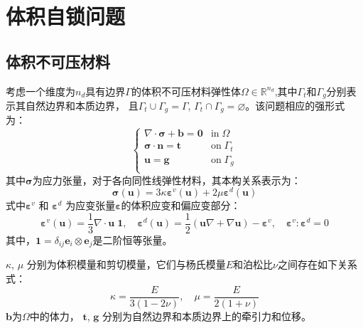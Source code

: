 \chapter{体积自锁问题}
\section{体积不可压材料}               
考虑一个维度为$n_d$具有边界$\Gamma$的体积不可压材料弹性体$\Omega\in \mathbb R^{n_d}$,其中$\Gamma_t$和$\Gamma_g$分别表示其自然边界和本质边界，
且$\Gamma_t \cup \Gamma_g = \Gamma$, $\Gamma_t \cap \Gamma_g = \varnothing$。该问题相应的强形式为：
\begin{equation}\label{strong_penalty}
    \begin{cases}
        \nabla \cdot \boldsymbol \sigma + \boldsymbol b = \boldsymbol 0 & \mathrm{in} \; \Omega \\
        \boldsymbol \sigma \cdot \boldsymbol n = \boldsymbol t & \mathrm{on} \; \Gamma_t \\
        \boldsymbol u = \boldsymbol g & \mathrm{on} \; \Gamma_g \\
\end{cases}
\end{equation}
其中$\boldsymbol \sigma$为应力张量，对于各向同性线弹性材料，其本构关系表示为：
\begin{equation}\label{stress_penalty}
    \boldsymbol \sigma(\boldsymbol u) = 3\kappa \boldsymbol \varepsilon^v(\boldsymbol u) + 2\mu \boldsymbol \varepsilon^d(\boldsymbol u) 
\end{equation}
式中$\boldsymbol \varepsilon^v$ 和 $\boldsymbol \varepsilon^d$ 为应变张量$\boldsymbol \varepsilon$的体积应变和偏应变部分：
\begin{equation}
    \boldsymbol \varepsilon^v(\boldsymbol u) =\frac{1}{3} \nabla \cdot \boldsymbol u \; \boldsymbol 1, \quad
    \boldsymbol \varepsilon^d(\boldsymbol u) =\frac{1}{2}(\boldsymbol u \nabla + \nabla \boldsymbol u) - \boldsymbol \varepsilon^v, \quad
    \boldsymbol \varepsilon^v : \boldsymbol \varepsilon^d = 0
\end{equation}
其中，$\boldsymbol 1 = \delta_{ij} \boldsymbol e_i \otimes \boldsymbol e_j$是二阶恒等张量。

$\kappa$, $\mu$ 分别为体积模量和剪切模量，它们与杨氏模量$E$和泊松比$\nu$之间存在如下关系式：
\begin{equation}\label{modulus}
    \kappa = \frac{E}{3(1-2\nu)}, \quad \mu = \frac{E}{2(1+\nu)}
\end{equation}
$\boldsymbol b$为$\Omega$中的体力， $\boldsymbol t$, $\boldsymbol g$ 分别为自然边界和本质边界上的牵引力和位移。

